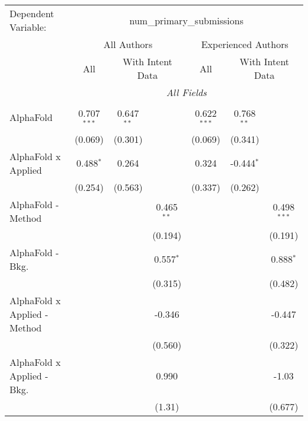 \begingroup
\centering
\begin{tabular}{lcccccc}
   \tabularnewline \midrule \midrule
   Dependent Variable: & \multicolumn{6}{c}{num\_primary\_submissions}\\
 & \multicolumn{3}{c}{All Authors} & \multicolumn{3}{c}{Experienced Authors} \\
\cmidrule(lr){2-4} \cmidrule(lr){5-7}
 & \multicolumn{1}{c}{All} & \multicolumn{2}{c}{With Intent Data} & \multicolumn{1}{c}{All} & \multicolumn{2}{c}{With Intent Data} \\
\cmidrule(lr){2-2} \cmidrule(lr){3-4} \cmidrule(lr){5-5} \cmidrule(lr){6-7}
 & \multicolumn{6}{c}{\textit{All Fields}} \\ \\
   AlphaFold                      & 0.707$^{***}$ & 0.647$^{**}$ &               & 0.622$^{***}$ & 0.768$^{**}$ &   \\   
                                  & (0.069)       & (0.301)      &               & (0.069)       & (0.341)      &   \\   
   AlphaFold x Applied            & 0.488$^{*}$   & 0.264        &               & 0.324         & -0.444$^{*}$ &   \\   
                                  & (0.254)       & (0.563)      &               & (0.337)       & (0.262)      &   \\   
   AlphaFold - Method             &               &              & 0.465$^{**}$  &               &              & 0.498$^{***}$\\   
                                  &               &              & (0.194)       &               &              & (0.191)\\   
   AlphaFold - Bkg.               &               &              & 0.557$^{*}$   &               &              & 0.888$^{*}$\\   
                                  &               &              & (0.315)       &               &              & (0.482)\\   
   AlphaFold x Applied - Method   &               &              & -0.346        &               &              & -0.447\\   
                                  &               &              & (0.560)       &               &              & (0.322)\\   
   AlphaFold x Applied - Bkg.     &               &              & 0.990         &               &              & -1.03\\   
                                  &               &              & (1.31)        &               &              & (0.677)\\   

\end{tabular}
